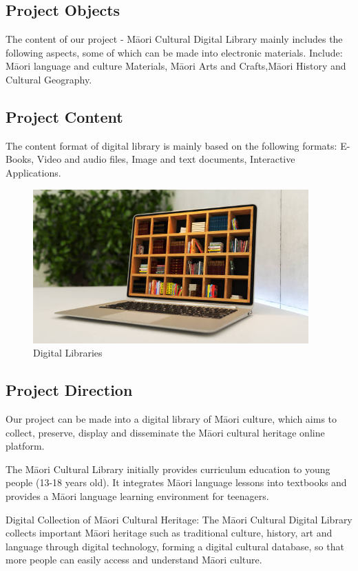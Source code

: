 \subsection{Project Objects}
The content of our project - Māori Cultural Digital Library mainly includes the following aspects, some of which can be made into electronic materials. Include: Māori language and culture Materials, Māori Arts and Crafts,Māori History and Cultural Geography.

\subsection{Project Content}
The content format of digital library is mainly based on the following formats:
E-Books, Video and audio files, Image and text documents, Interactive Applications.

\begin{figure}[htbp]
  \centerline{\includegraphics[width=300pt]{images/M1-2-1.png}}
  \caption{Digital Libraries}
\end{figure}

\subsection{Project Direction}
Our project can be made into a digital library of Māori culture, which aims to collect, preserve, display and disseminate the Māori cultural heritage online platform.

The Māori Cultural Library initially provides curriculum education to young people (13-18 years old). It integrates Māori language lessons into textbooks and provides a Māori language learning environment for teenagers.

Digital Collection of Māori Cultural Heritage: The Māori Cultural Digital Library collects important Māori heritage such as traditional culture, history, art and language through digital technology, forming a digital cultural database, so that more people can easily access and understand Māori culture.

